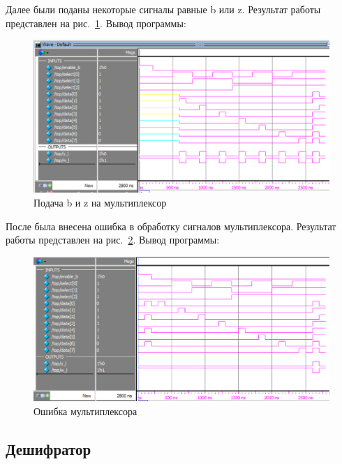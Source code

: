 \documentclass[a4paper,14pt]{article}
\begin{document}
    Далее были поданы некоторые сигналы равные b или z.
    Результат работы представлен на рис.~\ref{fig:02_mux_bz}.
    Вывод программы:
    {\small {}}

    \begin{figure}[H]
        \centering
        \includegraphics[width=\linewidth]{images/02_mux_bz}
        \caption{Подача b и z на мультиплексор}
        \label{fig:02_mux_bz}
    \end{figure}

    После была внесена ошибка в обработку сигналов мультиплексора.
    Результат работы представлен на рис.~\ref{fig:02_mux_error}.
    Вывод программы:
    {\small {}}

    \begin{figure}[H]
        \centering
        \includegraphics[width=\linewidth]{images/02_mux_error}
        \caption{Ошибка мультиплексора}
        \label{fig:02_mux_error}
    \end{figure}

    \subsection{Дешифратор}
\end{document}
